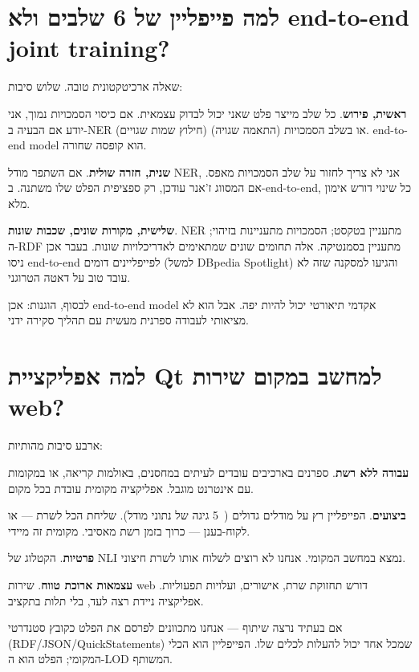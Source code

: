 \documentclass[12pt,a4paper]{article}
\begin{document}
\section{\texthebrew{למה פייפליין של 6 שלבים ולא end-to-end joint training?}}
\begin{hebrew}
שאלה ארכיטקטונית טובה. שלוש סיבות:
\par
\textbf{ראשית, פירוש}. כל שלב מייצר פלט שאני יכול לבדוק עצמאית. אם כיסוי הסמכויות נמוך, אני יודע אם הבעיה ב-NER (חילוץ שמות שגויים) או בשלב הסמכויות (התאמה שגויה). end-to-end model הוא קופסה שחורה.
\par
\textbf{שנית, חזרה שולית}. אם השתפר מודל NER, אני לא צריך לחזור על שלב הסמכויות מאפס. אם המסווג ז'אנר עודכן, רק ספציפית הפלט שלו משתנה. ב-end-to-end, כל שינוי דורש אימון מלא.
\par
\textbf{שלישית, מקורות שונים, שכבות שונות}. NER מתעניין בטקסט; הסמכויות מתעניינות בזיהוי; ה-RDF מתעניין בסמנטיקה. אלה תחומים שונים שמתאימים לאדריכלויות שונות. בעבר אכן ניסו end-to-end לפייפליינים דומים (למשל DBpedia Spotlight) והגיעו למסקנה שזה לא עובד טוב על דאטה הטרוגני.
\par
לבסוף, הוגנות: אכן end-to-end model אקדמי תיאורטי יכול להיות יפה. אבל הוא לא מציאותי לעבודה ספרנית מעשית עם תהליך סקירה ידני.
\end{hebrew}


\section{\texthebrew{למה אפליקציית Qt למחשב במקום שירות web?}}
\begin{hebrew}
ארבע סיבות מהותיות:
\par
\textbf{עבודה ללא רשת}. ספרנים בארכיבים עובדים לעיתים במחסנים, באולמות קריאה, או במקומות עם אינטרנט מוגבל. אפליקציה מקומית עובדת בכל מקום.
\par
\textbf{ביצועים}. הפייפליין רץ על מודלים גדולים (~5 גיגה של נתוני מודל). שליחת הכל לשרת — או לקוח-בענן — כרוך בזמן רשת מאסיבי. מקומית זה מיידי.
\par
\textbf{פרטיות}. הקטלוג של NLI נמצא במחשב המקומי. אנחנו לא רוצים לשלוח אותו לשרת חיצוני.
\par
\textbf{עצמאות ארוכת טווח}. שירות web דורש תחזוקת שרת, אישורים, ועלויות תפעוליות. אפליקציה ניידת רצה לעד, בלי תלות בתקציב.
\par
אם בעתיד נרצה שיתוף — אנחנו מתכוונים לפרסם את הפלט כקובץ סטנדרטי (RDF/JSON/QuickStatements) שמכל אחד יכול להעלות לכלים שלו. הפייפליין הוא הכלי המקומי; הפלט הוא ה-LOD המשותף.
\end{hebrew}
\end{document}
